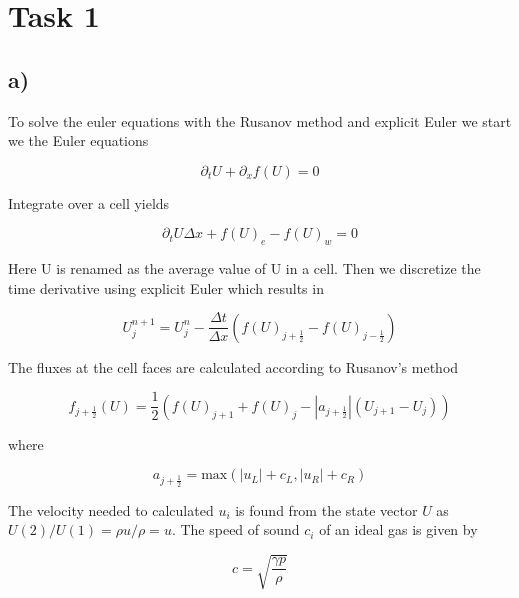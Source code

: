 \documentclass{article}
\newcommand{\oh}{\frac{1}{2}}
\begin{document}

\section{Task 1}

\subsection{a)}

To solve the euler equations with the Rusanov method and explicit Euler we start we the Euler equations

\begin{equation}
\partial_t U + \partial_x f(U)  = 0
\end{equation}

Integrate over a cell yields

\begin{equation}
\partial_t U \Delta x + f(U)_e - f(U)_w = 0
\end{equation}

Here U is renamed as the average value of U in a cell. Then we discretize the time derivative using explicit Euler which results in

\begin{equation}
U_j^{n+1}  = U_j^n - \frac{\Delta t}{\Delta x} ( f(U)_{j+\oh} - f(U)_{j-\oh} )
\end{equation}

The fluxes at the cell faces are calculated according to Rusanov's method

\begin{equation}
f_{j+\oh}(U) = \oh (f(U)_{j+1} + f(U)_j - |a_{j+\oh}| (U_{j+1} - U_j) )
\end{equation}

where 

\begin{equation}
a_{j+\oh} = \text{max}(|u_L| + c_L, |u_R| + c_R)
\end{equation}

The velocity needed to calculated $u_{i}$ is found from the state vector $U$ as $U(2)/U(1) = \rho u /\rho = u$. The speed of sound $c_i$ of an ideal gas is given by

\begin{equation}
c = \sqrt{\frac{\gamma p }{\rho}}
\end{equation}
\end{document}
